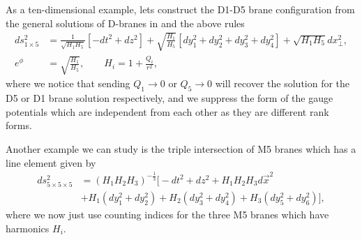 As a ten-dimensional example, lets construct the D1-D5 brane configuration \cite{Maldacena:1996ky} from the general solutions of D-branes in  and the above rules
\begin{equation}
\begin{aligned}
\label{eq:d1d510d}
	ds^2_{1 \times 5} &= \frac{1}{\sqrt{H_1 H_5}} \left[-dt^2 + dz^2 \right] + \sqrt{\frac{H_1}{H_5}} \left[dy_1^2 + dy_2^2 + dy_3^2 + dy_4^2 \right]  + \sqrt{H_1 H_5} dx^2_\perp, \\
	e^{\phi} &= \sqrt{\frac{H_1}{H_5}}, \qquad H_i = 1 + \frac{Q_i}{r^2},
\end{aligned}
\end{equation}
where we notice that sending $Q_1 \rightarrow 0$ or $Q_5 \rightarrow 0$ will recover the solution for the D5 or D1 brane solution respectively, and we suppress the form of the gauge potentials which are independent from each other as they are different rank forms.

Another example we can study is the triple intersection of M5 branes \cite{Tseytlin:1996bh} which has a line element given by
\begin{equation}
\label{eq:triplem5}
\begin{aligned}
    ds_{5 \times 5 \times 5}^2 &= (H_1 H_2 H_3)^{-\frac{1}{3}} \big[ -dt^2 + dz^2 + H_1 H_2 H_3 d\vec{x}^{2} \\
    &+ H_1(dy_1^2 + dy_2^2) + H_2(dy_3^2 + dy_4^2) + H_3(dy_5^2 + dy_6^2) \big],
\end{aligned}
\end{equation}
where we now just use counting indices for the three M5 branes which have harmonics $H_i$.

